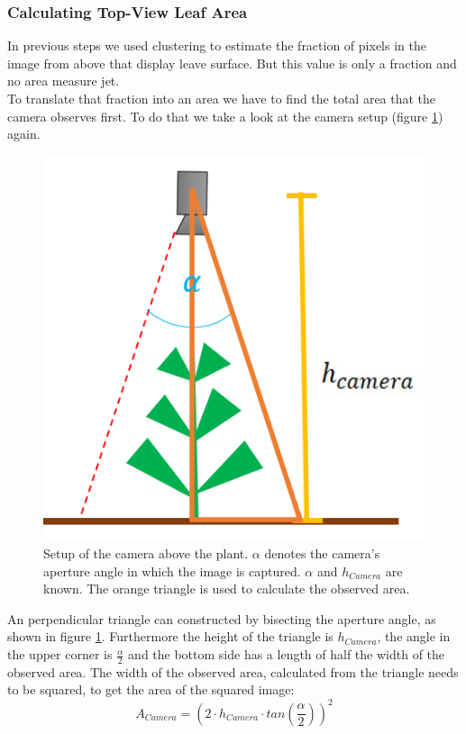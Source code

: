 \graphicspath{{members/tf/figures/}}

\subsubsection{Calculating Top-View Leaf Area}


In previous steps we used clustering to estimate the fraction of pixels in the image from above that display leave surface. But this value is only a fraction and no area measure jet.\\
To translate that fraction into an area we have to find the total area that the camera observes first. To do that we take a look at the camera setup (figure \ref{fig:setupAbove}) again.
   \begin{figure}[H]
       \centering
       \includegraphics[scale=0.6]{setupAbove.PNG}
       \caption{Setup of the camera above the plant. $\alpha$ denotes the camera's aperture angle in which the image is captured. $\alpha$ and $h_{Camera}$ are known. The orange triangle is used to calculate the observed area.}
       \label{fig:setupAbove}
   \end{figure}
An perpendicular triangle can constructed by bisecting the aperture angle, as shown in figure \ref{fig:setupAbove}.
Furthermore the height of the triangle is $h_{Camera}$, the angle in the upper corner is $\frac{\alpha}{2}$ and the bottom side has a length of half the width of the observed area. The width of the observed area, calculated from the triangle needs to be squared, to get the area of the squared image:
$$A_{Camera} = (2\cdot h_{Camera}\cdot tan(\frac{\alpha}{2}))^2$$

